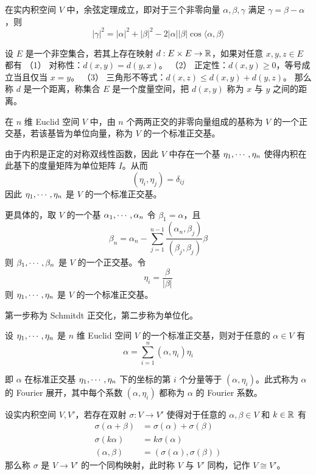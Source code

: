 \begin{proposition}
    在实内积空间 $V$ 中，余弦定理成立，即对于三个非零向量 $\alpha,\beta,\gamma$ 满足 $\gamma = \beta - \alpha$，则
    \[ |\gamma|^2  = |\alpha|^2 + |\beta|^2 - 2 |\alpha| |\beta| \cos\langle\alpha,\beta\rangle \]
\end{proposition}

\begin{definition}
    设 $E$ 是一个非空集合，若其上存在映射 $d : E \times E \to \mathbb{R}$，如果对任意 $x,y,z\in E$ 都有
    （1） 对称性：$d(x,y) = d(y,x)$。
    （2） 正定性：$d(x,y) \geqslant $0，等号成立当且仅当 $x = y$。
    （3） 三角形不等式：$d(x,z) \leqslant d(x,y) + d(y,z)$。
    那么称 $d$ 是一个距离，称集合 $E$ 是一个度量空间，把 $d(x,y)$ 称为 $x$ 与 $y$ 之间的距离。
\end{definition}

\begin{definition}
    在 $n$ 维 Euclid 空间 $V$ 中，由 $n$ 个两两正交的非零向量组成的基称为 $V$ 的一个正交基，若该基皆为单位向量，称为 $V$ 的一个标准正交基。
\end{definition}

由于内积是正定的对称双线性函数，因此 $V$ 中存在一个基 $\eta_1,\cdots,\eta_n$ 使得内积在此基下的度量矩阵为单位矩阵 $I$。从而
\[ (\eta_i,\eta_j) = \delta_{ij} \]
因此 $\eta_1,\cdots,\eta_n$ 是 $V$ 的一个标准正交基。

更具体的，取 $V$ 的一个基 $\alpha_1,\cdots,\alpha_n$ 令 $\beta_1 = \alpha$，且
\[ \beta_n = \alpha_n - \sum_{j=1}^{n-1} \frac{(\alpha_n,\beta_j)}{(\beta_j,\beta_j)} \beta \]
则 $\beta_1,\cdots,\beta_n$ 是 $V$ 的一个正交基。令
\[ \eta_i = \frac{\beta}{|\beta|} \]
则 $\eta_1,\cdots,\eta_n$ 是 $V$ 的一个标准正交基。

第一步称为 Schmitdt 正交化，第二步称为单位化。

\begin{theorem}
    设 $\eta_1,\cdots,\eta_n$ 是 $n$ 维 Euclid 空间 $V$ 的一个标准正交基，则对于任意的 $\alpha \in V$ 有
    \[ \alpha = \sum_{i=1}^n (\alpha,\eta_i)\eta_i \]
\end{theorem}

即 $\alpha$ 在标准正交基 $\eta_1,\cdots,\eta_n$ 下的坐标的第 $i$ 个分量等于 $(\alpha,\eta_i)$。此式称为 $\alpha$ 的 Fourier 展开，其中每个系数 $(\alpha,\eta_i)$ 都称为 $\alpha$ 的 Fourier 系数。

\begin{definition}
    设实内积空间 $V,V'$，若存在双射 $\sigma : V \to V'$ 使得对于任意的 $\alpha,\beta \in V$ 和 $k \in \mathbb{R}$ 有
    \begin{equation*}
        \begin{aligned}
            \sigma(\alpha + \beta) &= \sigma(\alpha) + \sigma(\beta)\\
            \sigma(k\alpha) &= k\sigma(\alpha)\\
            (\alpha,\beta) &= (\sigma(\alpha),\sigma(\beta))
        \end{aligned}
    \end{equation*}
    那么称 $\sigma$ 是 $V \to V'$ 的一个同构映射，此时称 $V$ 与 $V'$ 同构，记作 $V \cong V'$。
\end{definition}

